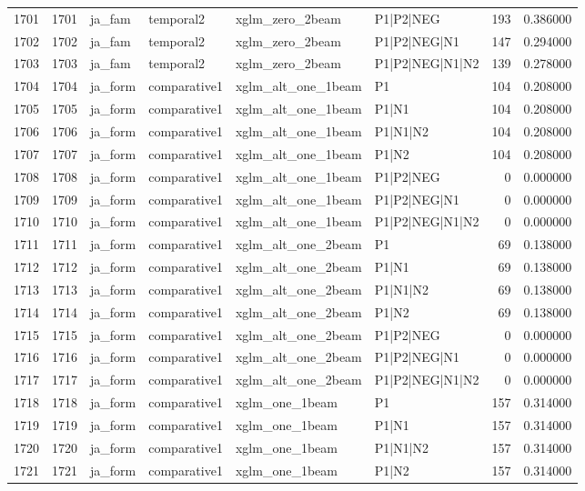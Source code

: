 \begin{tabular}{lrllllrr}
1701 & 1701 & ja_fam & temporal2 & xglm_zero_2beam & P1|P2|NEG & 193 & 0.386000 \\
1702 & 1702 & ja_fam & temporal2 & xglm_zero_2beam & P1|P2|NEG|N1 & 147 & 0.294000 \\
1703 & 1703 & ja_fam & temporal2 & xglm_zero_2beam & P1|P2|NEG|N1|N2 & 139 & 0.278000 \\
1704 & 1704 & ja_form & comparative1 & xglm_alt_one_1beam & P1 & 104 & 0.208000 \\
1705 & 1705 & ja_form & comparative1 & xglm_alt_one_1beam & P1|N1 & 104 & 0.208000 \\
1706 & 1706 & ja_form & comparative1 & xglm_alt_one_1beam & P1|N1|N2 & 104 & 0.208000 \\
1707 & 1707 & ja_form & comparative1 & xglm_alt_one_1beam & P1|N2 & 104 & 0.208000 \\
1708 & 1708 & ja_form & comparative1 & xglm_alt_one_1beam & P1|P2|NEG & 0 & 0.000000 \\
1709 & 1709 & ja_form & comparative1 & xglm_alt_one_1beam & P1|P2|NEG|N1 & 0 & 0.000000 \\
1710 & 1710 & ja_form & comparative1 & xglm_alt_one_1beam & P1|P2|NEG|N1|N2 & 0 & 0.000000 \\
1711 & 1711 & ja_form & comparative1 & xglm_alt_one_2beam & P1 & 69 & 0.138000 \\
1712 & 1712 & ja_form & comparative1 & xglm_alt_one_2beam & P1|N1 & 69 & 0.138000 \\
1713 & 1713 & ja_form & comparative1 & xglm_alt_one_2beam & P1|N1|N2 & 69 & 0.138000 \\
1714 & 1714 & ja_form & comparative1 & xglm_alt_one_2beam & P1|N2 & 69 & 0.138000 \\
1715 & 1715 & ja_form & comparative1 & xglm_alt_one_2beam & P1|P2|NEG & 0 & 0.000000 \\
1716 & 1716 & ja_form & comparative1 & xglm_alt_one_2beam & P1|P2|NEG|N1 & 0 & 0.000000 \\
1717 & 1717 & ja_form & comparative1 & xglm_alt_one_2beam & P1|P2|NEG|N1|N2 & 0 & 0.000000 \\
1718 & 1718 & ja_form & comparative1 & xglm_one_1beam & P1 & 157 & 0.314000 \\
1719 & 1719 & ja_form & comparative1 & xglm_one_1beam & P1|N1 & 157 & 0.314000 \\
1720 & 1720 & ja_form & comparative1 & xglm_one_1beam & P1|N1|N2 & 157 & 0.314000 \\
1721 & 1721 & ja_form & comparative1 & xglm_one_1beam & P1|N2 & 157 & 0.314000 \\

\end{tabular}
